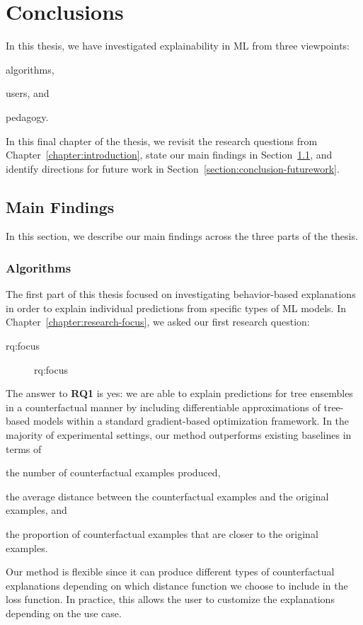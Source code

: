 
\chapter{Conclusions}
\label{chapter:conclusions}

\acresetall
In this thesis, we have investigated explainability in ML from three viewpoints: 
\begin{inparaenum}[(i)]
	\item algorithms, 
	\item users, and
	\item pedagogy. 
\end{inparaenum}
In this final chapter of the thesis, we revisit the research questions from Chapter~\ref{chapter:introduction}, state our main findings in Section~\ref{section:conclusion-findings}, and identify directions for future work in Section~\ref{section:conclusion-futurework}. 





\section{Main Findings}
\label{section:conclusion-findings}
In this section, we describe our main findings across the three parts of the thesis. 

\subsection{Algorithms}

The first part of this thesis focused on investigating behavior-based explanations in order to explain individual predictions from specific types of ML models. 
In Chapter~\ref{chapter:research-focus}, we asked our first research question:

\begin{description}\item[\acs{rq:focus}]\acl{rq:focus}\end{description}

\noindent
The answer to \textbf{RQ1} is yes: we are able to explain predictions for tree ensembles in a counterfactual manner by including differentiable approximations of tree-based models within a standard gradient-based optimization framework. 
In the majority of experimental settings, our method outperforms existing baselines in terms of
\begin{inparaenum}[(i)]
	\item the number of counterfactual examples produced, 
	\item the average distance between the counterfactual examples and the original examples, 
	and
	\item the proportion of counterfactual examples that are closer to the original examples. 
\end{inparaenum}
Our method is flexible since it can produce different types of counterfactual explanations depending on which distance function we choose to include in the loss function. 
In practice, this allows the user to customize the explanations depending on the use case. 

